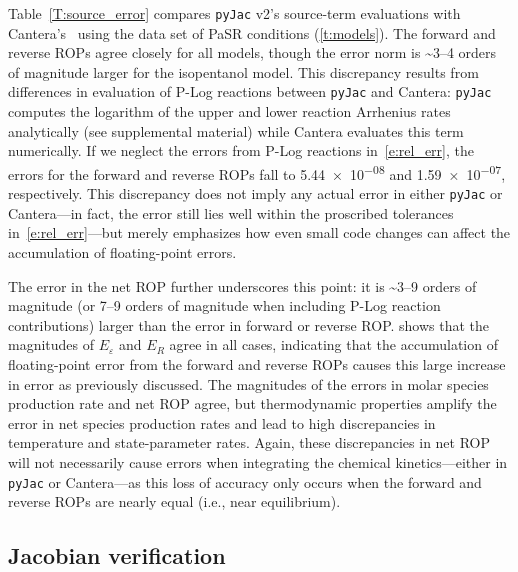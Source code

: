 \documentclass[12pt,number,sort&compress,preprint]{elsarticle}
\begin{document}
Table~\ref{T:source_error} compares \texttt{pyJac} v2's source-term evaluations with Cantera's~\cite{Cantera} using the data set of PaSR conditions (\cref{t:models}).
The forward and reverse ROPs agree closely for all models, though the error norm is \textasciitilde\numrange{3}{4} orders of magnitude larger for the isopentanol model.
This discrepancy results from differences in evaluation of P-Log reactions between \texttt{pyJac} and Cantera: \texttt{pyJac} computes the logarithm of the upper and lower reaction Arrhenius rates analytically (see supplemental material) while Cantera evaluates this term numerically.
If we neglect the errors from P-Log reactions in~\cref{e:rel_err}, the errors for the forward and reverse ROPs fall to \num{5.44e-08} and \num{1.59e-07}, respectively.
This discrepancy does not imply any actual error in either \texttt{pyJac} or Cantera---in fact, the error still lies well within the proscribed tolerances in~\cref{e:rel_err}---but merely emphasizes
how even small code changes can affect the accumulation of floating-point errors.

The error in the net ROP further underscores this point: it is
\textasciitilde\numrange{3}{9} orders of magnitude (or \numrange{7}{9} orders of magnitude when including P-Log reaction contributions) larger than the error in forward or reverse ROP.
 shows that the magnitudes of $E_{\varepsilon}$ and $E_R$ agree in all cases, indicating that the accumulation of floating-point error from the forward and reverse ROPs causes this large increase in error as previously discussed.
The magnitudes of the errors in molar species production rate and net ROP agree, but
thermodynamic properties amplify the error in net species production rates and lead to high discrepancies in temperature and state-parameter rates.
Again, these discrepancies in net ROP will not necessarily cause errors when integrating the chemical kinetics---either in \texttt{pyJac} or Cantera---as this loss of accuracy only occurs when the forward and reverse ROPs are nearly equal (i.e., near equilibrium).

\subsection{Jacobian verification}
\label{S:jac_valid}
\end{document}
